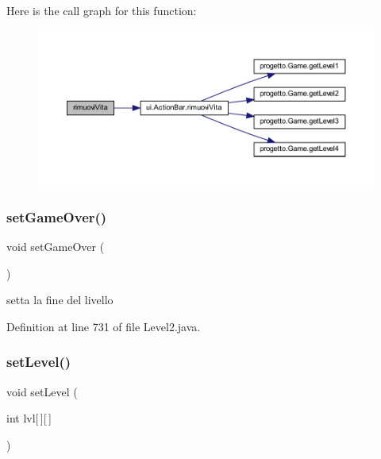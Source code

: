 Here is the call graph for this function\+:\nopagebreak
\begin{figure}[H]
\begin{center}
\leavevmode
\includegraphics[width=350pt]{classscenes_1_1_level2_a484775c889ccd8602b66ad795b141534_cgraph}
\end{center}
\end{figure}
\mbox{\label{classscenes_1_1_level2_a49e1d0816e9e0cabfb855147f399f5b5}} 
\subsubsection{\texorpdfstring{set\+Game\+Over()}{setGameOver()}}
{\footnotesize\ttfamily void set\+Game\+Over (\begin{DoxyParamCaption}{ }\end{DoxyParamCaption})}



setta la fine del livello 



Definition at line 731 of file Level2.\+java.

\mbox{\label{classscenes_1_1_level2_afdd7363804bf6696ce4a46d6448844ed}} 
\subsubsection{\texorpdfstring{set\+Level()}{setLevel()}}
{\footnotesize\ttfamily void set\+Level (\begin{DoxyParamCaption}\item[{int}]{lvl\mbox{[}$\,$\mbox{]}\mbox{[}$\,$\mbox{]} }\end{DoxyParamCaption})}



